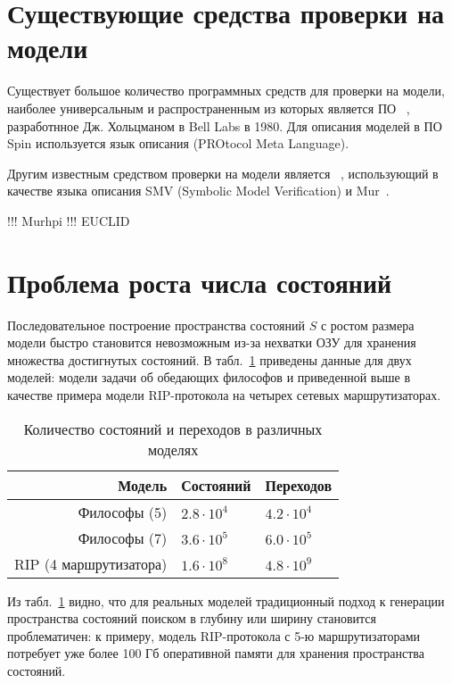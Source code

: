 \documentclass[a4paper,notitlepage,14pt]{article}
\begin{document}
\section{Существующие средства проверки на модели}
\label{sec:existing-tools}

Существует большое количество программных средств для проверки на модели, наиболее
универсальным и распространенным из которых является ПО ~\cite{SpinRoot},
разработнное Дж. Хольцманом в Bell Labs в 1980. Для описания моделей в ПО Spin
используется язык описания  (PROtocol Meta Language).

Другим известным средством проверки на модели является
~\cite{Cimatti00nusmv:a}, использующий в качестве языка описания SMV (Symbolic
Model Verification) и Mur\phi~\cite{Dill96murphi}.

!!! Murhpi
!!! EUCLID

\section{Проблема роста числа состояний}
\label{sec:state-explosion}

Последовательное построение пространства состояний $S$ с ростом размера модели быстро
становится невозможным из-за нехватки ОЗУ для хранения множества достигнутых состояний. В
табл.~\ref{tab:models-statecount} приведены данные для двух моделей: модели задачи об
обедающих философов и приведенной выше в качестве примера модели RIP-протокола на четырех
сетевых маршрутизаторах.

\begin{table}
  \centering
  \begin{tabular}{|r|l|l|}
    \hline
    Модель                  & Состояний         & Переходов       \\
    \hline
    Философы (5)            & $2.8 \cdot 10^4$  & $4.2 \cdot 10^4$ \\
    Философы (7)            & $3.6 \cdot 10^5$  & $6.0 \cdot 10^5$ \\
    RIP (4 маршрутизатора)  & $1.6 \cdot 10^8$  & $4.8 \cdot 10^9$ \\
    \hline
  \end{tabular}
  \caption{Количество состояний и переходов в различных моделях}
\label{tab:models-statecount}
\end{table}

Из табл.~\ref{tab:models-statecount} видно, что для реальных моделей традиционный подход к
генерации пространства состояний поиском в глубину или ширину становится проблематичен: к
примеру, модель RIP-протокола с 5-ю маршрутизаторами потребует уже более 100 Гб
оперативной памяти для хранения пространства состояний.
\end{document}

